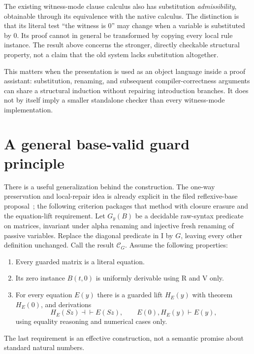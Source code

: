 \documentclass[11pt]{article}
\theoremstyle{definition}\newtheorem{definition}[theorem]{Definition}
\theoremstyle{remark}\newtheorem{remark}[theorem]{Remark}
\newcommand{\Cg}{\ensuremath{\mathcal C_G}}
\begin{document}
The existing witness-mode clause calculus also has substitution \emph{admissibility}, obtainable through its equivalence with the native calculus. The distinction is that its literal test ``the witness is $0$'' may change when a variable is substituted by $0$. Its proof cannot in general be transformed by copying every local rule instance. The result above concerns the stronger, directly checkable structural property, not a claim that the old system lacks substitution altogether.

This matters when the presentation is used as an object language inside a proof assistant: substitution, renaming, and subsequent compiler-correctness arguments can share a structural induction without repairing introduction branches. It does not by itself imply a smaller standalone checker than every witness-mode implementation.

\section{A general base-valid guard principle}
\label{sec:guards}

There is a useful generalization behind the construction. The one-way preservation and local-repair idea is already explicit in the filed reflexive-base proposal~\cite{reflexive}; the following criterion packages that method with closure erasure and the equation-lift requirement. Let $G_y(B)$ be a decidable raw-syntax predicate on matrices, invariant under alpha renaming and injective fresh renaming of passive variables. Replace the diagonal predicate in I by $G$, leaving every other definition unchanged. Call the result \Cg. Assume the following properties:
\begin{enumerate}[label=(\alph*)]
\item Every guarded matrix is a literal equation.
\item Its zero instance $B(t,0)$ is uniformly derivable using R and V only.
\item For every equation $E(y)$ there is a guarded lift $H_E(y)$ with theorem $H_E(0)$, and derivations
\[
 H_E(Sz)\dashv\vdash E(Sz),\qquad E(0),H_E(y)\vdash E(y),
\]
using equality reasoning and numerical cases only.
\end{enumerate}
The last requirement is an effective construction, not a semantic promise about standard natural numbers.
\end{document}

